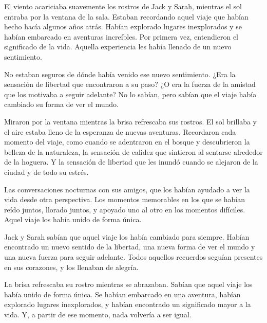 

El viento acariciaba suavemente los rostros de Jack y Sarah, mientras el sol entraba por la ventana de la sala. Estaban recordando aquel viaje que habían hecho hacía algunos años atrás. Habían explorado lugares inexplorados y se habían embarcado en aventuras increíbles. Por primera vez, entendieron el significado de la vida. Aquella experiencia les había llenado de un nuevo sentimiento.

No estaban seguros de dónde había venido ese nuevo sentimiento. ¿Era la sensación de libertad que encontraron a su paso? ¿O era la fuerza de la amistad que los motivaba a seguir adelante? No lo sabían, pero sabían que el viaje había cambiado su forma de ver el mundo.

Miraron por la ventana mientras la brisa refrescaba sus rostros. El sol brillaba y el aire estaba lleno de la esperanza de nuevas aventuras. Recordaron cada momento del viaje, como cuando se adentraron en el bosque y descubrieron la belleza de la naturaleza, la sensación de calidez que sintieron al sentarse alrededor de la hoguera. Y la sensación de libertad que les inundó cuando se alejaron de la ciudad y de todo su estrés.

Las conversaciones nocturnas con sus amigos, que los habían ayudado a ver la vida desde otra perspectiva. Los momentos memorables en los que se habían reído juntos, llorado juntos, y apoyado uno al otro en los momentos difíciles. Aquel viaje los había unido de forma única.

Jack y Sarah sabían que aquel viaje los había cambiado para siempre. Habían encontrado un nuevo sentido de la libertad, una nueva forma de ver el mundo y una nueva fuerza para seguir adelante. Todos aquellos recuerdos seguían presentes en sus corazones, y los llenaban de alegría.

La brisa refrescaba su rostro mientras se abrazaban. Sabían que aquel viaje los había unido de forma única. Se habían embarcado en una aventura, habían explorado lugares inexplorados, y habían encontrado un significado mayor a la vida. Y, a partir de ese momento, nada volvería a ser igual.